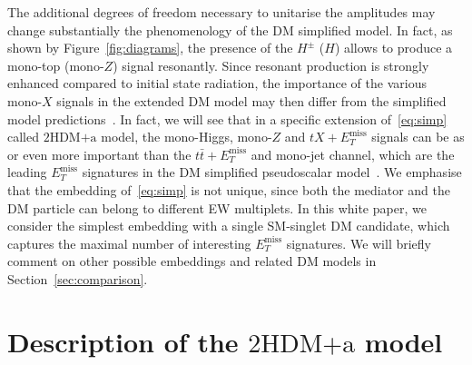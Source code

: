 \documentclass[a4paper, 11pt,notoc]{article}
\newcommand{\MET}{\ensuremath{E_T^\mathrm{miss}}\xspace}
\newcommand{\hdma}{\ensuremath{\textrm{2HDM+a}}\xspace}
\begin{document}
The additional degrees of freedom necessary to unitarise the amplitudes may change substantially the phenomenology of the DM simplified model. In fact, as shown by Figure~\ref{fig:diagrams}, the presence of the $H^\pm$ ($H$) allows to produce a mono-top (mono-$Z$)  signal resonantly. Since resonant production is strongly enhanced compared to initial state radiation, the  importance of the various mono-$X$ signals in the extended DM model may then differ from the simplified model predictions~\cite{Goncalves:2016iyg,Bauer:2017ota,Pani:2017qyd}. In fact, we will see that in a specific extension of~\eqref{eq:simp}  called \hdma model, the mono-Higgs, mono-$Z$ and $t X + \MET$ signals can be as or even more important than the $t \bar t + \MET$ and mono-jet channel, which are  the leading $\MET$ signatures in the DM simplified pseudoscalar model~\cite{Haisch:2012kf,Fox:2012ru,Buckley:2014fba,Harris:2014hga,Haisch:2015ioa,Mattelaer:2015haa,Backovic:2015soa,Neubert:2015fka,Arina:2016cqj}. We emphasise that the embedding of~\eqref{eq:simp} is not unique, since  both the mediator and the DM particle can belong to different EW multiplets. In this white paper, we consider the simplest embedding with a single SM-singlet DM candidate, which captures the maximal number of interesting $\MET$ signatures. We will briefly comment on other possible embeddings and related DM models in Section~\ref{sec:comparison}.  


\section{Description of the \hdma model}
\label{sec:modeldescription}
\end{document}
